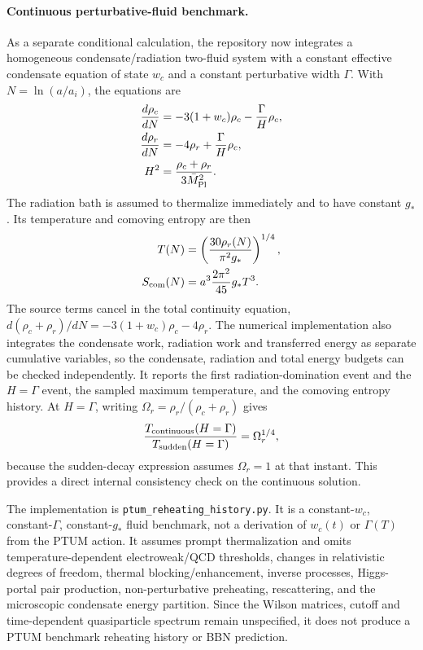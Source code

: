 \documentclass[epj]{svjour}
\begin{document}
\paragraph{Continuous perturbative-fluid benchmark.}
As a separate conditional calculation, the repository now integrates
a homogeneous condensate/radiation two-fluid system with a constant
effective condensate equation of state $w_c$ and a constant perturbative
width $\Gamma$. With $N=\ln(a/a_i)$, the equations are
\begin{equation}
\begin{aligned}
\frac{d\rho_c}{dN}
&=-3(1+w_c)\rho_c-\frac{\Gamma}{H}\rho_c,\\
\frac{d\rho_r}{dN}
&=-4\rho_r+\frac{\Gamma}{H}\rho_c,\\
H^2&=\frac{\rho_c+\rho_r}{3\bar M_{\rm Pl}^2}.
\end{aligned}
\label{eq:ptum_continuous_reheating_boltzmann}
\end{equation}
The radiation bath is assumed to thermalize immediately and to have
constant $g_*$. Its temperature and comoving entropy are then
\begin{equation}
\begin{aligned}
T(N)&=\left(\frac{30\rho_r(N)}{\pi^2g_*}\right)^{1/4},\\
S_{\rm com}(N)&=a^3\frac{2\pi^2}{45}g_*T^3.
\end{aligned}
\label{eq:ptum_continuous_reheating_entropy}
\end{equation}
The source terms cancel in the total continuity equation,
$d(\rho_c+\rho_r)/dN=-3(1+w_c)\rho_c-4\rho_r$.
The numerical implementation also integrates the condensate work,
radiation work and transferred energy as separate cumulative variables,
so the condensate, radiation and total energy budgets can be checked
independently. It reports the first radiation-domination event and the
$H=\Gamma$ event, the sampled maximum temperature, and the comoving
entropy history. At $H=\Gamma$, writing
$\Omega_r=\rho_r/(\rho_c+\rho_r)$ gives
\begin{equation}
\frac{T_{\rm continuous}(H=\Gamma)}
{T_{\rm sudden}(H=\Gamma)}
=\Omega_r^{1/4},
\end{equation}
because the sudden-decay expression assumes $\Omega_r=1$ at that
instant. This provides a direct internal consistency check on the
continuous solution.

The implementation is
\texttt{ptum\_reheating\_history.py}. It is a constant-$w_c$,
constant-$\Gamma$, constant-$g_*$ fluid benchmark, not a derivation
of $w_c(t)$ or $\Gamma(T)$ from the PTUM action. It assumes prompt
thermalization and omits temperature-dependent electroweak/QCD
thresholds, changes in relativistic degrees of freedom, thermal
blocking/enhancement, inverse processes, Higgs-portal pair production,
non-perturbative preheating, rescattering, and the microscopic
condensate energy partition. Since the Wilson matrices, cutoff and
time-dependent quasiparticle spectrum remain unspecified, it does
not produce a PTUM benchmark reheating history or BBN prediction.
\end{document}
